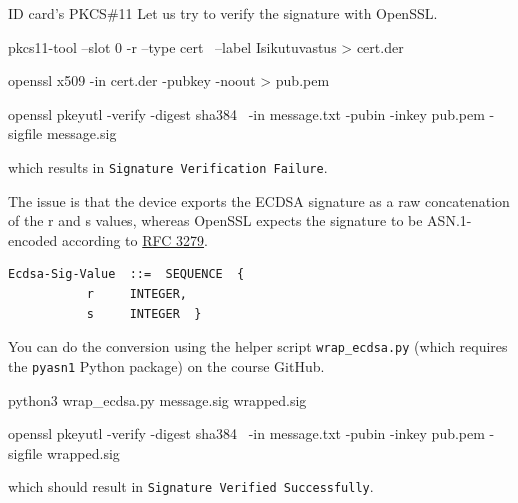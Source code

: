 \documentclass{practice}
\begin{document}
\begin{task}{ID card's PKCS\#11}
  Let us try to verify the signature with OpenSSL.
  \begin{cmdblock}
pkcs11-tool --slot 0 -r --type cert \
  --label Isikutuvastus > cert.der

openssl x509 -in cert.der -pubkey -noout > pub.pem

openssl pkeyutl -verify -digest sha384 \
  -in message.txt -pubin -inkey pub.pem -sigfile message.sig
  \end{cmdblock}
  which results in \texttt{Signature Verification Failure}.

  The issue is that the device exports the ECDSA signature as a raw concatenation of the r and s values, whereas OpenSSL expects the signature to be ASN.1-encoded according to \href{https://datatracker.ietf.org/doc/html/rfc3279#section-2.2.3}{RFC 3279}.
  \begin{Verbatim}
Ecdsa-Sig-Value  ::=  SEQUENCE  {
           r     INTEGER,
           s     INTEGER  }
  \end{Verbatim}

  You can do the conversion using the helper script \texttt{wrap\_ecdsa.py} (which requires the \texttt{pyasn1} Python package) on the course GitHub.
  \begin{cmdblock}
python3 wrap_ecdsa.py message.sig wrapped.sig

openssl pkeyutl -verify -digest sha384 \
  -in message.txt -pubin -inkey pub.pem -sigfile wrapped.sig
  \end{cmdblock}
  which should result in \texttt{Signature Verified Successfully}.
\end{task}
\end{document}
